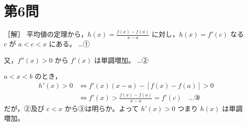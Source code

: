 \documentclass[../main.tex]{subfiles}
\begin{document}
\newpage

\section*{第6問}

［解］ 平均値の定理から，$h(x) = \frac{f(x) - f(a)}{x - a}$ に対し，$h(x) = f'(c)$ なる $c$ が $a < c < x$ にある。 \dots ①

又，$f''(x) > 0$ から $f'(x)$ は単調増加。 \dots ②

$a < x < b$ のとき，
\begin{align*}
  h'(x) > 0 &\iff f'(x)(x-a) - [f(x) - f(a)] > 0 \\
  &\iff f'(x) > \frac{f(x) - f(a)}{x - a} = f'(c) \quad \dots \text{③}
\end{align*}
だが，②及び $c < x$ から③は明らか。よって $h'(x) > 0$ つまり $h(x)$ は単調増加。
\end{document}
